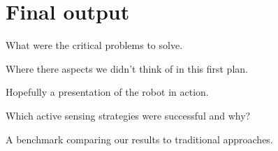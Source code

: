 \documentclass[a4paper,11pt,english]{article}
\begin{document}
\section{Final output}
What were the critical problems to solve.

Where there aspects we didn't think of in this first plan.

Hopefully a presentation of the robot in action.

Which active sensing strategies were successful and why?

A benchmark comparing our results to traditional approaches. 




\end{document}
